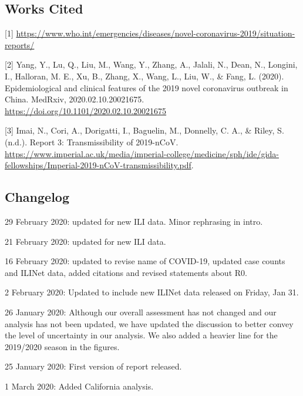 \documentclass[]{article}
\begin{document}
\hypertarget{works-cited}{%
\subsection{Works Cited}\label{works-cited}}

{[}1{]}
\url{https://www.who.int/emergencies/diseases/novel-coronavirus-2019/situation-reports/}

{[}2{]} Yang, Y., Lu, Q., Liu, M., Wang, Y., Zhang, A., Jalali, N.,
Dean, N., Longini, I., Halloran, M. E., Xu, B., Zhang, X., Wang, L.,
Liu, W., \& Fang, L. (2020). Epidemiological and clinical features of
the 2019 novel coronavirus outbreak in China. MedRxiv,
2020.02.10.20021675. \url{https://doi.org/10.1101/2020.02.10.20021675}

{[}3{]} Imai, N., Cori, A., Dorigatti, I., Baguelin, M., Donnelly, C.
A., \& Riley, S. (n.d.). Report 3: Transmissibility of 2019-nCoV.
\url{https://www.imperial.ac.uk/media/imperial-college/medicine/sph/ide/gida-fellowships/Imperial-2019-nCoV-transmissibility.pdf}.

\hypertarget{changelog}{%
\subsection{Changelog}\label{changelog}}

29 February 2020: updated for new ILI data. Minor rephrasing in intro.

21 February 2020: updated for new ILI data.

16 February 2020: updated to revise name of COVID-19, updated case
counts and ILINet data, added citations and revised statements about R0.

2 February 2020: Updated to include new ILINet data released on Friday,
Jan 31.

26 January 2020: Although our overall assessment has not changed and our
analysis has not been updated, we have updated the discussion to better
convey the level of uncertainty in our analysis. We also added a heavier
line for the 2019/2020 season in the figures.

25 January 2020: First version of report released.

1 March 2020: Added California analysis.
\end{document}
